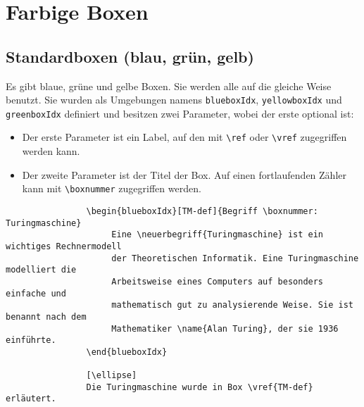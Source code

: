 	\chapter{Farbige Boxen}
		\section{Standardboxen (blau, grün, gelb)}
			Es gibt blaue, grüne und gelbe Boxen. Sie werden alle auf die gleiche Weise benutzt. Sie wurden als Umgebungen namens \verb|blueboxIdx|, \verb|yellowboxIdx| und \verb|greenboxIdx| definiert und besitzen zwei Parameter, wobei der erste optional ist:
			\begin{itemize}
				\item Der erste Parameter ist ein Label, auf den mit \verb|\ref| oder \verb|\vref| zugegriffen werden kann.
				\item Der zweite Parameter ist der Titel der Box. Auf einen fortlaufenden Zähler kann mit \verb|\boxnummer| zugegriffen werden.
			\end{itemize}
			 
			\begin{verbatim}
				\begin{blueboxIdx}[TM-def]{Begriff \boxnummer: Turingmaschine}
				     Eine \neuerbegriff{Turingmaschine} ist ein wichtiges Rechnermodell 
				     der Theoretischen Informatik. Eine Turingmaschine modelliert die 
				     Arbeitsweise eines Computers auf besonders einfache und 
				     mathematisch gut zu analysierende Weise. Sie ist benannt nach dem 
				     Mathematiker \name{Alan Turing}, der sie 1936 einführte.
				\end{blueboxIdx}
				
				[\ellipse]
				Die Turingmaschine wurde in Box \vref{TM-def} erläutert.
			\end{verbatim}
			 
		\newpage
